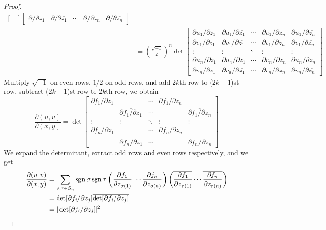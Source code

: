 \begin{proof}
\begin{align*}
\begin{bmatrix}
        \end{bmatrix}\begin{bmatrix}
            \partial/\partial{z_1} & \partial/\partial{\overline{z_1}} & \cdots & \partial/\partial{z_n} & \partial/\partial{\overline{z_n}}
        \end{bmatrix}\\
        &=\left(\frac{\sqrt{-1}}{2}\right)^n\det\begin{bmatrix}
            \partial{u_1}/\partial{z_1} & \partial{u_1}/\partial{\overline{z_1}} & \cdots & \partial{u_1}/\partial{z_n} & \partial{u_1}/\partial{\overline{z_n}}\\
            \partial{v_1}/\partial{z_1} & \partial{v_1}/\partial{\overline{z_1}} & \cdots & \partial{v_1}/\partial{z_n} & \partial{v_1}/\partial{\overline{z_n}}\\
            \vdots & \vdots & \ddots & \vdots & \vdots \\
            \partial{u_n}/\partial{z_1} & \partial{u_n}/\partial{\overline{z_1}} & \cdots & \partial{u_n}/\partial{z_n} & \partial{u_n}/\partial{\overline{z_n}}\\
            \partial{v_n}/\partial{z_1} & \partial{v_n}/\partial{\overline{z_1}} & \cdots & \partial{v_n}/\partial{z_n} & \partial{v_n}/\partial{\overline{z_n}}
        \end{bmatrix}
    \end{align*}
    Multiply $\sqrt{-1}$ on even rows, $1/2$ on odd rows, and add $2k$th row to ($2k-1$)st row, subtract ($2k-1$)st row to $2k$th row, we obtain
    \[\frac{\partial(u,v)}{\partial(x,y)}=\det\begin{bmatrix}
        \partial{f_1}/\partial{z_1} & & \cdots & \partial{f_1}/\partial{z_n} & \\
         & \overline{\partial{f_1}/\partial{z_1}} & \cdots & & \overline{\partial{f_1}/\partial{z_n}} \\
        \vdots & \vdots & \ddots & \vdots & \vdots \\
        \partial{f_n}/\partial{z_1} & & \cdots & \partial{f_n}/\partial{z_n} & \\
        & \overline{\partial{f_n}/\partial{z_1}} & \cdots & & \overline{\partial{f_n}/\partial{z_n}}
    \end{bmatrix}\]
    We expand the determinant, extract odd rows and even rows respectively, and we get
    \begin{align*}
        \frac{\partial(u,v)}{\partial(x,y)}&=\sum_{\sigma,\tau\in S_n}\operatorname{sgn}\sigma\operatorname{sgn}\tau\left(\frac{\partial{f_1}}{\partial{z_{\sigma(1)}}}\cdots\frac{\partial{f_n}}{\partial{z_{\sigma(n)}}}\right)\left(\overline{\frac{\partial{f_1}}{\partial{z_{\tau(1)}}}}\cdots\overline{\frac{\partial{f_n}}{\partial{z_{\tau(n)}}}}\right)\\
        &=\det[\partial{f_i}/\partial{z_j}]\overline{\det[\partial{f_i}/\partial{z_j}]}\\
        &=|\det[\partial{f_i}/\partial{z_j}]|^2\qedhere
    \end{align*}
\end{proof}

